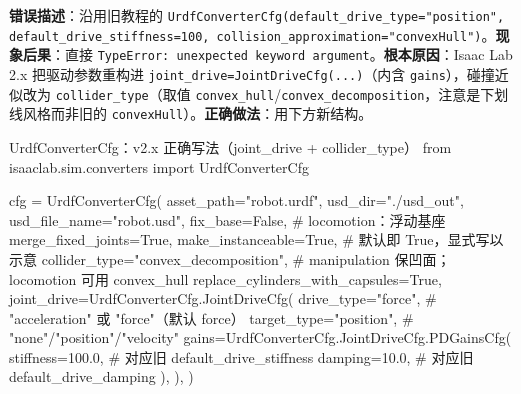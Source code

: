 \begin{pitfall}
\textbf{错误描述}：沿用旧教程的 \texttt{UrdfConverterCfg(default\_drive\_type="position", default\_drive\_stiffness=100, collision\_approximation="convexHull")}。\textbf{现象后果}：直接 \texttt{TypeError: unexpected keyword argument}。\textbf{根本原因}：Isaac Lab 2.x 把驱动参数重构进 \texttt{joint\_drive=JointDriveCfg(...)}（内含 \texttt{gains}），碰撞近似改为 \texttt{collider\_type}（取值 \texttt{convex\_hull}/\texttt{convex\_decomposition}，注意是下划线风格而非旧的 \texttt{convexHull}）。\textbf{正确做法}：用下方新结构。
\end{pitfall}

\begin{codebox}[Python]{UrdfConverterCfg：v2.x 正确写法（joint\_drive + collider\_type）}
from isaaclab.sim.converters import UrdfConverterCfg

cfg = UrdfConverterCfg(
    asset_path="robot.urdf",
    usd_dir="./usd_out",
    usd_file_name="robot.usd",
    fix_base=False,                         # locomotion：浮动基座
    merge_fixed_joints=True,
    make_instanceable=True,                 # 默认即 True，显式写以示意
    collider_type="convex_decomposition",   # manipulation 保凹面；locomotion 可用 convex_hull
    replace_cylinders_with_capsules=True,
    joint_drive=UrdfConverterCfg.JointDriveCfg(
        drive_type="force",                 # "acceleration" 或 "force"（默认 force）
        target_type="position",             # "none"/"position"/"velocity"
        gains=UrdfConverterCfg.JointDriveCfg.PDGainsCfg(
            stiffness=100.0,                # 对应旧 default_drive_stiffness
            damping=10.0,                   # 对应旧 default_drive_damping
        ),
    ),
)
\end{codebox}

